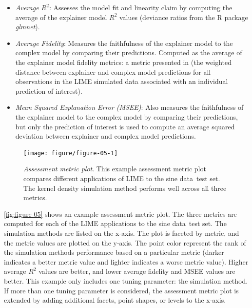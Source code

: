 \documentclass[AMS,STIX2COL]{WileyNJD-v2}\usepackage[]{graphicx}\usepackage[]{color}
\newenvironment{knitrout}{}{} %
\newcommand{\data}{sine data}
\begin{document}
\begin{itemize}
\item \emph{Average $R^2$}: Assesses the model fit and linearity claim by computing the average of the explainer model $R^2$ values (deviance ratios from the R package \emph{glmnet}).

\item \emph{Average Fidelity}: Measures the faithfulness of the explainer model to the complex model by comparing their predictions. Computed as the average of the explainer model fidelity metrics: a metric presented in \citet{ribeiro:2016} (the weighted distance between explainer and complex model predictions for all observations in the LIME simulated data associated with an individual prediction of interest). 

\item \emph{Mean Squared Explanation Error (MSEE)}: Also measures the faithfulness of the explainer model to the complex model by comparing their predictions, but only the prediction of interest is used to compute an average squared deviation between explainer and complex model predictions.
\end{itemize}

\begin{figure}[!bp]
\begin{knitrout}
\color{fgcolor}

{\centering \texttt{[image: figure/figure-05-1]} 

}


\end{knitrout}
\caption{\emph{Assessment metric plot}. This example assessment metric plot  compares different applications of LIME to the \data \ test set. The kernel density simulation method performs well across all three metrics.}
\label{fig:figure-05}
\end{figure}

\autoref{fig:figure-05} shows an example assessment metric plot. The three metrics are computed for each of the LIME applications to the \data \ test set. The simulation methods are listed on the x-axis. The plot is faceted by metric, and the metric values are plotted on the y-axis. The point color represent the rank of the simulation methods performance based on a particular metric (darker indicates a better metric value and lighter indicates a worse metric value). Higher average $R^2$ values are better, and lower average fidelity and MSEE values are better. This example only includes one tuning parameter: the simulation method. If more than one tuning parameter is considered, the assessment metric plot is extended by adding additional facets, point shapes, or levels to the x-axis.
\end{document}
